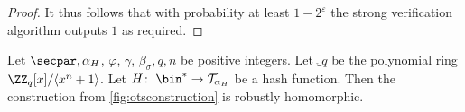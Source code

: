 \begin{proof}
%   
It thus follows that with probability at least $1-2^\varepsilon$ the strong verification algorithm outputs $1$ as required.
\end{proof}


\begin{lemma}\label{lem:kots_homomorphic}
  Let $\secpar, \alpha_H$, $\varphi$, $\gamma$, $\beta_\sigma,q,n$ be positive integers.
  Let $\ring_q$ be the polynomial ring $\ZZ_q[x]/\langle x^n+1\rangle$.
  Let $H\colon\; \bin^* \to \tern_{\alpha_H}$ be a hash function.
  Then the construction from \autoref{fig:otsconstruction} is robustly homomorphic.
\end{lemma}

